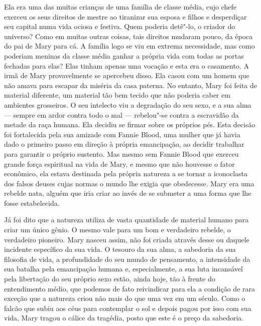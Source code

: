 Ela era uma das muitas crianças de uma família de classe média, cujo
chefe exerceu os seus direitos de mestre ao tiranizar sua esposa e
filhos e desperdiçar seu capital numa vida ociosa e festiva. Quem
poderia detê"-lo, o criador do universo? Como em muitas outras coisas,
tais direitos mudaram pouco, da época do pai de Mary para cá. A família
logo se viu em extrema necessidade, mas como poderiam meninas da classe
média ganhar a própria vida com todas as portas fechadas para elas? Elas
tinham apenas uma vocação e esta era o casamento. A irmã de Mary
provavelmente se apercebeu disso. Ela casou com um homem que não amava
para escapar da miséria da casa paterna. No entanto, Mary foi feita
de material diferente, um material tão bem tecido que não poderia caber
em ambientes grosseiros. O seu intelecto viu a degradação do seu sexo, e
a sua alma --- sempre em ardor contra todo o mal --- rebelou"-se contra a
escravidão da metade da raça humana. Ela decidiu se firmar sobre
os próprios pés. Esta decisão foi fortalecida pela sua amizade com Fannie Blood,
uma mulher que já havia dado o primeiro passo em direção à própria
emancipação, ao decidir trabalhar para garantir o próprio sustento.
Mas mesmo sem Fannie Blood que exerceu grande força espiritual na vida
de Mary, e mesmo que não houvesse o fator econômico, ela estava
destinada pela própria natureza a se tornar a iconoclasta dos falsos
deuses cujas normas o mundo lhe exigia que obedecesse. Mary era uma
rebelde nata, alguém que iria criar ao invés de se submeter a uma forma
que lhe fosse estabelecida.

Já foi dito que a natureza utiliza de vasta quantidade de material
humano para criar um único gênio. O mesmo vale para um bom e verdadeiro
rebelde, o verdadeiro pioneiro. Mary nasceu assim, não foi criada
através desse ou daquele incidente específico da sua vida. O tesouro da
sua alma, a sabedoria da sua filosofia de vida, a profundidade do seu
mundo de pensamento, a intensidade da sua batalha pela emancipação
humana e, especialmente, a sua luta incansável pela libertação do seu
próprio sexo estão, ainda hoje, tão à frente do entendimento médio, que
podemos de fato reivindicar para ela a condição de rara exceção que a
natureza criou não mais do que uma vez em um século. Como o falcão que
subiu aos céus para contemplar o sol e depois pagou por isso com sua
vida, Mary tragou o cálice da tragédia, posto que este é o preço da
sabedoria.

